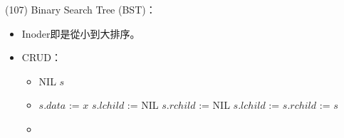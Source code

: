 \item \begin{theorem}{(107)} Binary Search Tree (BST)： \label{bst}\begin{itemize}
        \item Inoder即是從小到大排序。
        \item CRUD：\begin{itemize}
            \item \begin{algorithm}[H]
                \begin{algorithmic}[1]
                            \State \Return NIL
                            \State \Return {}
                            \State \Return {}
                        \Else
                            \State \Return $s$
                        \EndIf
                    \EndFunction
                \end{algorithmic}
            \end{algorithm}
            \item \begin{algorithm}[H]
                \begin{algorithmic}[1]
                            \State $s.data$ := $x$
                            \State $s.lchild$ := NIL
                            \State $s.rchild$ := NIL
                        \Else
                             
                                \State $s.lchild$ := 
                                \State $s.rchild$ := 
                            \EndIf
                        \EndIf
                        \State \Return $s$
                    \EndFunction
                \end{algorithmic}
            \end{algorithm}
            \item \begin{algorithm}[H]
                \begin{algorithmic}[1]

\end{algorithmic}
\end{algorithm}
\end{itemize}
\end{itemize}
\end{theorem}
